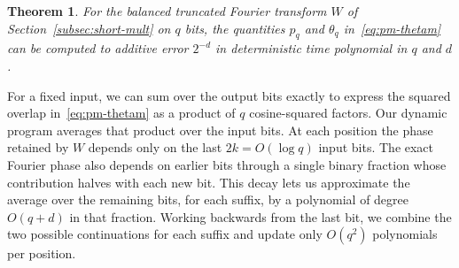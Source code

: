 \documentclass[11pt]{article}
\newtheorem{theorem}{Theorem}
\begin{document}
\begin{theorem}\label{thm:uniform-angle}
For the balanced truncated Fourier transform $W$ of Section~\ref{subsec:short-mult} on $q$ bits, the quantities $p_q$ and $\theta_q$ in~\eqref{eq:pm-thetam} can be computed to additive error $2^{-d}$ in deterministic time polynomial in $q$ and $d$.
\end{theorem}

For a fixed input, we can sum over the output bits exactly to express the squared overlap in~\eqref{eq:pm-thetam} as a product of $q$ cosine-squared factors. Our dynamic program averages that product over the input bits. At each position the phase retained by $W$ depends only on the last $2k=O(\log q)$ input bits. The exact Fourier phase also depends on earlier bits through a single binary fraction whose contribution halves with each new bit. This decay lets us approximate the average over the remaining bits, for each suffix, by a polynomial of degree $O(q+d)$ in that fraction. Working backwards from the last bit, we combine the two possible continuations for each suffix and update only $O(q^2)$ polynomials per position.
\end{document}
